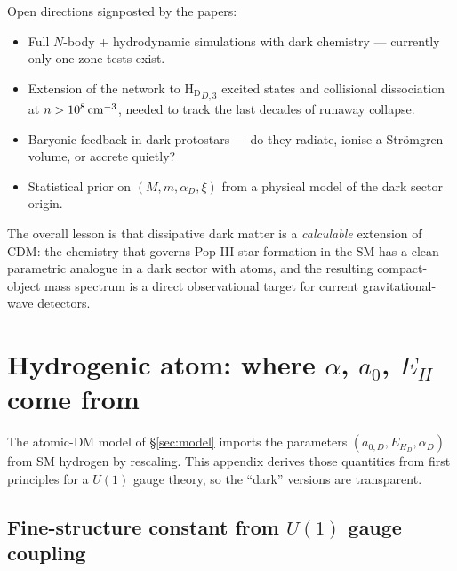 \documentclass[12pt]{article}
\newcommand{\HD}{\mathrm{H_D}}
\newcommand{\alphaD}{\alpha_D}
\begin{document}
Open directions signposted by the papers:
\begin{itemize}
  \item Full $N$-body + hydrodynamic simulations with dark chemistry
        --- currently only one-zone tests exist.
  \item Extension of the network to $\HD_{D,3}$ excited states and
        collisional dissociation at $n > 10^8\,{\rm cm^{-3}}$, needed
        to track the last decades of runaway collapse.
  \item Baryonic feedback in dark protostars --- do they radiate,
        ionise a Str\"omgren volume, or accrete quietly?
  \item Statistical prior on $(M, m, \alphaD, \xi)$ from a physical
        model of the dark sector origin.
\end{itemize}

The overall lesson is that dissipative dark matter is a
\emph{calculable} extension of CDM: the chemistry that governs Pop III
star formation in the SM has a clean parametric analogue in a dark
sector with atoms, and the resulting compact-object mass spectrum is a
direct observational target for current gravitational-wave detectors.

\appendix

\section{Hydrogenic atom: where $\alpha$, $a_0$, $E_H$ come from}
\label{app:hydrogenic}

The atomic-DM model of \S\ref{sec:model} imports the parameters
$(a_{0,D}, E_{H_D}, \alpha_D)$ from SM hydrogen by rescaling.  This
appendix derives those quantities from first principles for a
$U(1)$ gauge theory, so the ``dark'' versions are transparent.

\subsection{Fine-structure constant from $U(1)$ gauge coupling}
\label{app:alpha}
\end{document}
